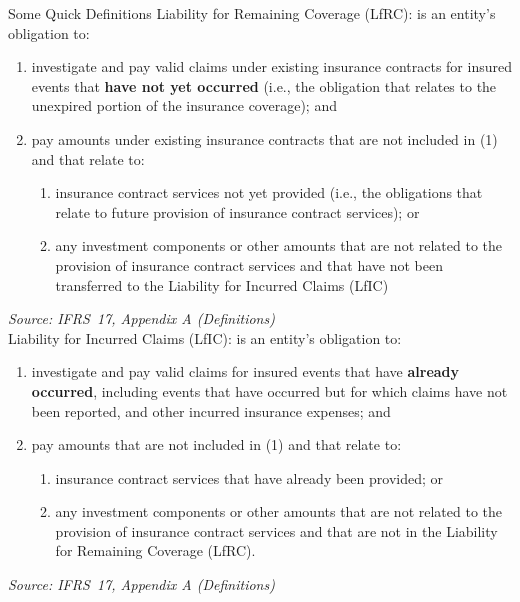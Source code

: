 \documentclass[aspectratio=169]{beamer}
\begin{document}
\begin{frame}[allowframebreaks]{Some Quick Definitions}
Liability for Remaining Coverage (LfRC): is an entity’s obligation to:
\begin{enumerate}
  \item investigate and pay valid claims under existing insurance contracts for insured events that \textbf{have not yet occurred} (i.e., the obligation that relates to the unexpired portion of the insurance coverage); and
  \item pay amounts under existing insurance contracts that are not included in (1) and that relate to:
  \begin{enumerate}
    \item insurance contract services not yet provided (i.e., the obligations that relate to future provision of insurance contract services); or 
    \item any investment components or other amounts that are not related to the provision of insurance contract services and that have not been transferred to the Liability for Incurred Claims (LfIC)
  \end{enumerate}
\end{enumerate}

  \vspace{0.2em}
  \footnotesize
  \textit{Source: IFRS~17, Appendix A (Definitions)}\\
  \vspace{0.4em}
  \normalsize
  \framebreak
Liability for Incurred Claims (LfIC): is an entity’s obligation to:
\begin{enumerate}
  \item investigate and pay valid claims for insured events that have \textbf{already occurred}, including events that have occurred but for which claims have not been reported, and other incurred insurance expenses; and 
  \item pay amounts that are not included in (1) and that relate to:\begin{enumerate}
  \item insurance contract services that have already been provided; or
  \item any investment components or other amounts that are not related to the provision of insurance contract services and that are not in the Liability for Remaining Coverage (LfRC).
  \end{enumerate}
\end{enumerate}

  \vspace{0.2em}
  \footnotesize
  \textit{Source: IFRS~17, Appendix A (Definitions)}
  \vspace{0.4em}
  \normalsize
\end{frame}
\end{document}
